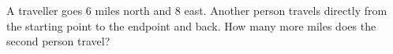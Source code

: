 A traveller goes 6 miles north and 8 east. Another person travels directly from the starting point to the endpoint and back. How many more miles does the second person travel?
